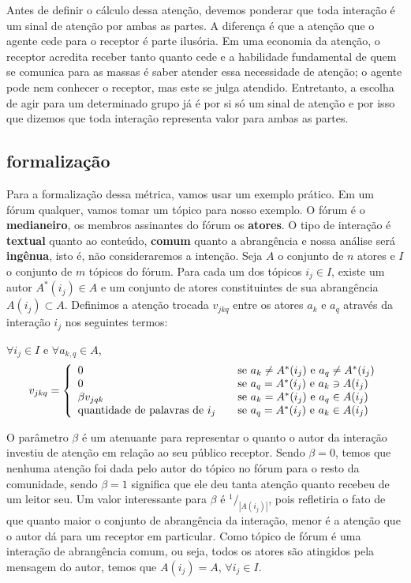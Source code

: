 \documentclass{article}
\begin{document}
Antes de definir o cálculo dessa atenção, devemos ponderar que toda interação é
um sinal de atenção por ambas as partes. A diferença é que a atenção que o
agente cede para o receptor é parte ilusória. Em uma economia da atenção,
o receptor acredita receber tanto quanto cede e a habilidade fundamental de quem
se comunica para as massas é saber atender essa necessidade de atenção; o agente
pode nem conhecer o receptor, mas este se julga atendido. Entretanto, a escolha
de agir para um determinado grupo já é por si só um sinal de atenção e por isso
que dizemos que toda interação representa valor para ambas as partes.
\subsection{formalização}
Para a formalização dessa métrica, vamos usar um exemplo prático. Em um fórum
qualquer, vamos tomar um tópico para nosso exemplo. O fórum é o
\textbf{medianeiro}, os membros assinantes do fórum os \textbf{atores}. O tipo
de interação é \textbf{textual} quanto ao conteúdo, \textbf{comum} quanto a
abrangência e nossa análise será \textbf{ingênua}, isto é, não consideraremos a
intenção. Seja $A$ o conjunto de $n$ atores e $I$ o conjunto de $m$ tópicos
do fórum. Para cada um dos tópicos $i_j \in I$, existe um autor $A^*(i_j) \in A$
e um conjunto de atores constituintes de sua abrangência $A(i_j) \subset A$.
Definimos a atenção trocada $v_{jkq}$ entre os atores $a_k$ e $a_q$ através da
interação $i_j$ nos seguintes termos:

$\forall i_j \in I$ e $\forall a_{k,q} \in A$,
\begin{equation}
\label{def:atencao}
v_{jkq} = \left\{ 
\begin{array}{l l}
  0 & \quad \text{se $a_k \neq A^*(i_j)$ e $a_q \neq A^*(i_j)$}\\
  0 & \quad \text{se $a_q =A^*(i_j)$ e $a_k \ni A(i_j)$}\\
  \beta v_{jqk} & \quad \text{se $a_k=A^*(i_j)$ e $a_q \in A(i_j)$}\\
  \text{quantidade de palavras de $i_j$} & \quad \text{se $a_q=A^*(i_j)$ e $a_k
  \in A(i_j)$} \end{array} \right.
\end{equation}
 
O parâmetro $\beta$ é um atenuante para representar o quanto o autor da
interação investiu de atenção em relação ao seu público receptor. Sendo
$\beta=0$, temos que nenhuma atenção foi dada pelo autor do tópico no fórum
para o resto da comunidade, sendo $\beta=1$ significa que ele deu tanta atenção
quanto recebeu de um leitor seu. Um valor interessante para $\beta$ é
$^1/_{|A(i_j)|}$, pois refletiria o fato de que quanto maior o conjunto de
abrangência da interação, menor é a atenção que o autor dá para um receptor em
particular. Como tópico de fórum é uma interação de abrangência comum, ou seja,
todos os atores são atingidos pela mensagem do autor, temos que $A(i_j)=A$,
$\forall i_j \in I$.
\end{document}
